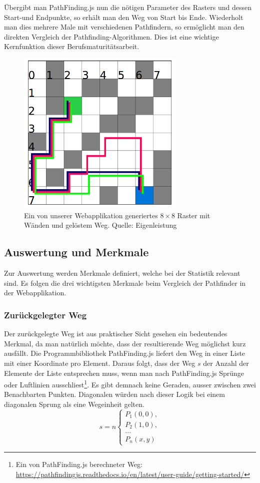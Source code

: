 \documentclass[12pt,a4paper,german]{report}
\begin{document}
Übergibt man PathFinding.js nun die nötigen Parameter des Rasters und dessen Start-und Endpunkte, so erhält man den Weg von Start bis Ende. Wiederholt man dies mehrere Male mit verschiedenen Pathfindern, so ermöglicht man den direkten Vergleich der Pathfinding-Algorithmen. Dies ist eine wichtige Kernfunktion dieser Berufsmaturitätsarbeit.
\begin{figure}[H]
  \centering
  \includegraphics[width=8cm]{grid3}
  \caption[Ein von unserer Webapplikation generiertes $8\times8$ Raster mit Wänden und gelöstem Weg.]{Ein von unserer Webapplikation generiertes $8\times8$ Raster mit Wänden und gelöstem Weg. Quelle: Eigenleistung}
  \label{fig:grid3}
\end{figure}
\subsection{Auswertung und Merkmale}
Zur Auswertung werden Merkmale definiert, welche bei der Statistik relevant sind. Es folgen die drei wichtigsten Merkmale beim Vergleich der Pathfinder in der Webapplikation.
\subsubsection{Zurückgelegter Weg}
Der zurückgelegte Weg ist aus praktischer Sicht gesehen ein bedeutendes Merkmal, da man natürlich möchte, dass der resultierende Weg möglichst kurz ausfällt. 
Die Programmbibliothek PathFinding.js liefert den Weg in einer Liste mit einer Koordinate pro Element.
Daraus folgt, dass der Weg $s$ der Anzahl der Elemente der Liste entsprechen muss, wenn man nach PathFinding.js Sprünge oder Luftlinien ausschliest\footnote{Ein von PathFinding.js berechneter Weg: \url{https://pathfindingjs.readthedocs.io/en/latest/user-guide/getting-started/}}. 
Es gibt demnach keine Geraden, ausser zwischen zwei Benachbarten Punkten.
Diagonalen würden nach dieser Logik bei einem diagonalen Sprung als eine Wegeinheit gelten.
\[ s = n
\begin{cases}
  P_1(0,0),\\
  P_2(1,0),\\
  ...\\
  P_n(x,y)
\end{cases}
\]
\end{document}
